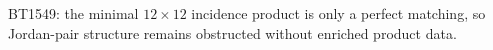 \begin{center}\small
BT1549: the minimal $12\times12$ incidence product is only a perfect matching, so Jordan-pair structure remains obstructed without enriched product data.
\end{center}
